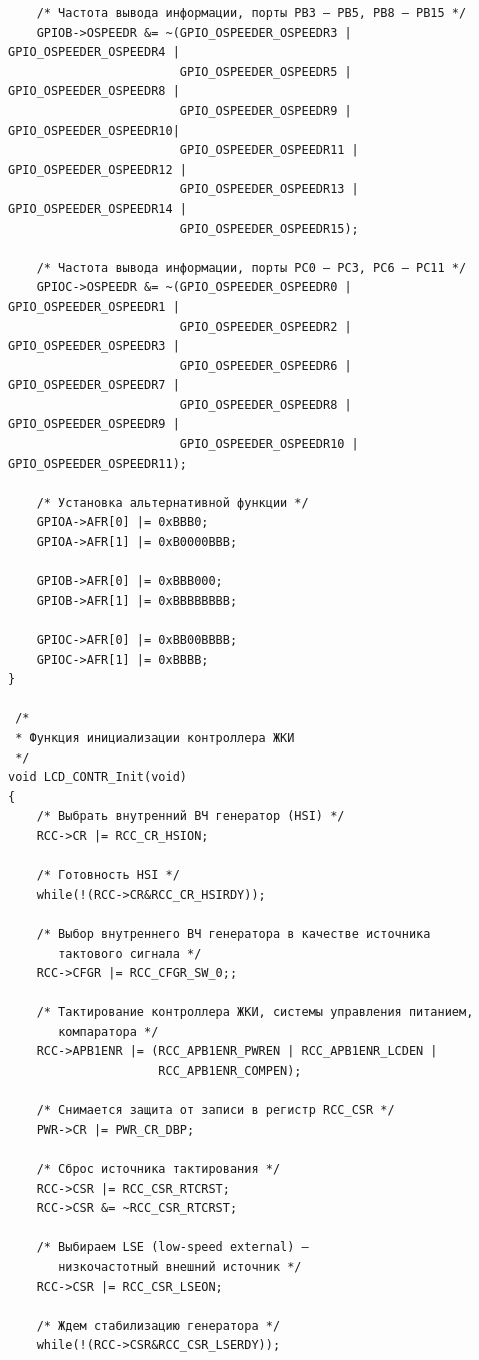 \begin{verbatim}
    /* Частота вывода информации, порты PB3 – PB5, PB8 – PB15 */
    GPIOB->OSPEEDR &= ~(GPIO_OSPEEDER_OSPEEDR3 | GPIO_OSPEEDER_OSPEEDR4 | 
                        GPIO_OSPEEDER_OSPEEDR5 | GPIO_OSPEEDER_OSPEEDR8 | 
                        GPIO_OSPEEDER_OSPEEDR9 | GPIO_OSPEEDER_OSPEEDR10| 
                        GPIO_OSPEEDER_OSPEEDR11 | GPIO_OSPEEDER_OSPEEDR12 |
                        GPIO_OSPEEDER_OSPEEDR13 | GPIO_OSPEEDER_OSPEEDR14 | 
                        GPIO_OSPEEDER_OSPEEDR15);

    /* Частота вывода информации, порты PC0 – PC3, PC6 – PC11 */
    GPIOC->OSPEEDR &= ~(GPIO_OSPEEDER_OSPEEDR0 | GPIO_OSPEEDER_OSPEEDR1 | 
                        GPIO_OSPEEDER_OSPEEDR2 | GPIO_OSPEEDER_OSPEEDR3 |
                        GPIO_OSPEEDER_OSPEEDR6 | GPIO_OSPEEDER_OSPEEDR7 | 
                        GPIO_OSPEEDER_OSPEEDR8 | GPIO_OSPEEDER_OSPEEDR9 |  
                        GPIO_OSPEEDER_OSPEEDR10 | GPIO_OSPEEDER_OSPEEDR11);

    /* Установка альтернативной функции */
    GPIOA->AFR[0] |= 0xBBB0;
    GPIOA->AFR[1] |= 0xB0000BBB;

    GPIOB->AFR[0] |= 0xBBB000;
    GPIOB->AFR[1] |= 0xBBBBBBBB;

    GPIOC->AFR[0] |= 0xBB00BBBB;
    GPIOC->AFR[1] |= 0xBBBB;
}

 /*
 * Функция инициализации контроллера ЖКИ
 */
void LCD_CONTR_Init(void)
{
    /* Выбрать внутренний ВЧ генератор (HSI) */
    RCC->CR |= RCC_CR_HSION;

    /* Готовность HSI */
    while(!(RCC->CR&RCC_CR_HSIRDY));

    /* Выбор внутреннего ВЧ генератора в качестве источника 
       тактового сигнала */
    RCC->CFGR |= RCC_CFGR_SW_0;;

    /* Тактирование контроллера ЖКИ, системы управления питанием, 
       компаратора */
    RCC->APB1ENR |= (RCC_APB1ENR_PWREN | RCC_APB1ENR_LCDEN | 
                     RCC_APB1ENR_COMPEN);

    /* Снимается защита от записи в регистр RCC_CSR */
    PWR->CR |= PWR_CR_DBP;

    /* Сброс источника тактирования */
    RCC->CSR |= RCC_CSR_RTCRST;
    RCC->CSR &= ~RCC_CSR_RTCRST;

    /* Выбираем LSE (low-speed external) — 
       низкочастотный внешний источник */
    RCC->CSR |= RCC_CSR_LSEON;

    /* Ждем стабилизацию генератора */
    while(!(RCC->CSR&RCC_CSR_LSERDY));


\end{verbatim}
